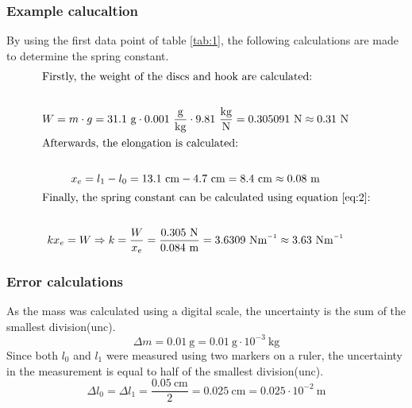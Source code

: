 \documentclass[a4paper, 10pt]{article}
\newcommand{\inv}{^{\raisebox{.2ex}{$\scriptscriptstyle-1$}}}
\begin{document}
\begin{flushleft}
\subsubsection{Example calucaltion}
By using the first data point of table \ref{tab:1}, the following calculations
are made to determine the spring constant.
\begin{gather*}
\intertext{Firstly, the weight of the discs and hook are calculated:} \\
 W = m \cdot g = 31.1~\mathrm{g} \cdot 0.001~\mathrm{\frac{g}{kg}} \cdot 9.81~\mathrm{\frac{kg}{N}} = 0.305091~\mathrm{N} \approx 0.31~\mathrm{N}\\
\intertext{Afterwards, the elongation is calculated:} \\
 x_e = l_1 - l_0 = 13.1~\mathrm{cm} - 4.7~\mathrm{cm} = 8.4~\mathrm{cm} \approx 0.08~\mathrm{m}\\
\intertext{Finally, the spring constant can be calculated using equation \ref{eq:2}:} \\
k x_e = W \Rightarrow k = \frac{W}{x_e} = \frac{0.305 ~\mathrm{N}}{0.084~\mathrm{m}} = 3.6309~\mathrm{Nm\inv} \approx 3.63~\mathrm{Nm\inv} 
\end{gather*}
\subsubsection{Error calculations}
As the mass was calculated using a digital scale, the uncertainty is the sum of
the smallest division(unc).
\[ \Delta m = 0.01~\mathrm{g} = 0.01~\mathrm{g} \cdot 10^{-3}~\mathrm{kg}\]
Since both $l_0$ and $l_1$ were measured using two markers on a ruler, the
uncertainty in the measurement is equal to half of the smallest division(unc).
\[ \Delta l_0 = \Delta l_1 = \frac{0.05~\mathrm{cm}}{2} = 0.025~\mathrm{cm} =
0.025 \cdot 10^{-2}~\mathrm{m} \]
\end{flushleft}
\end{document}
